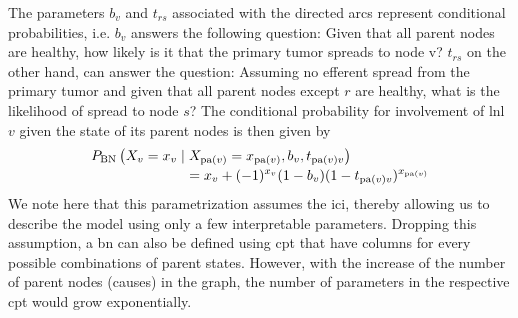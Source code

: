 \documentclass[\relativeRoot/main.tex]{subfiles}
\begin{document}
The parameters $b_v$ and $t_{rs}$ associated with the directed arcs represent conditional probabilities, i.e. $b_v$ answers the following question: Given that all parent nodes are healthy, how likely is it that the primary tumor spreads to node v? $t_{rs}$ on the other hand, can answer the question: Assuming no efferent spread from the primary tumor and given that all parent nodes except $r$ are healthy, what is the likelihood of spread to node $s$? The conditional probability for involvement of \gls{lnl} $v$ given the state of its parent nodes is then given by
%
\begin{equation} \label{eq:bn_cp}
    \begin{multlined}[0.7\textwidth]
        P_\text{BN} \left( X_v = x_v \mid X_{\pa(v)} = x_{\pa(v)}, b_v, t_{\pa(v)v} \right) \\
        = x_v + (-1)^{x_v} (1 - b_v) (1 - t_{\pa(v)v})^{x_{\pa(v)}}
    \end{multlined}
\end{equation}
%
We note here that this parametrization assumes the \acrlong{ici}, thereby allowing us to describe the model using only a few interpretable parameters. Dropping this assumption, a \gls{bn} can also be defined using \gls{cpt} that have columns for every possible combinations of parent states. However, with the increase of the number of parent nodes (causes) in the graph, the number of parameters in the respective \gls{cpt} would grow exponentially.
\end{document}
